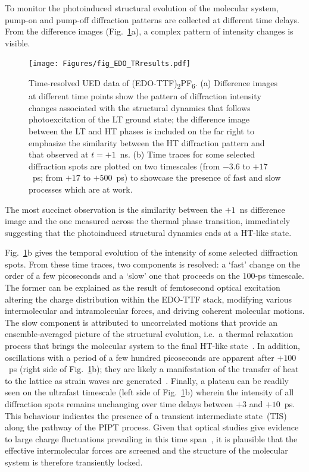 To monitor the photoinduced structural evolution of the molecular system,
pump-on and pump-off diffraction patterns are collected at different time delays.
From the difference images (Fig.~\ref{fig: EDO-TRresults}a),
a complex pattern of intensity changes is visible.
%
\begin{figure}[ht!]
  \centering
  \texttt{[image: Figures/fig\_EDO\_TRresults.pdf]}
  \caption[Time-resolved UED data of (EDO-TTF)\textsubscript{2}PF\textsubscript{6}.]{
  Time-resolved UED data of (EDO-TTF)\textsubscript{2}PF\textsubscript{6}.
  (a) Difference images at different time points show the pattern of diffraction intensity changes
  associated with the structural dynamics that follows photoexcitation of the LT ground state;
  the difference image between the LT and HT phases is included on the far right to emphasize
  the similarity between the HT diffraction pattern and that observed at $t = +1$~ns.
  (b) Time traces for some selected diffraction spots are plotted on two timescales
  (from $-3.6$ to $+17$~ps; from $+17$ to $+500$~ps)
  to showcase the presence of fast and slow processes which are at work.
  }
  \label{fig: EDO-TRresults}
\end{figure}
%
The most succinct observation is the similarity between the $+1$~ns difference image and the one measured
across the thermal phase transition, immediately suggesting that the photoinduced structural dynamics ends
at a HT-like state.

Fig.~\ref{fig: EDO-TRresults}b gives the temporal evolution of the intensity of
some selected diffraction spots. From these time traces, two components is resolved:
a `fast' change on the order of a few picoseconds and a `slow' one that proceeds on the 100-ps timescale.
%
The former can be explained as the result of femtosecond optical excitation
altering the charge distribution within the EDO-TTF stack, modifying various intermolecular and intramolecular forces,
and driving coherent molecular motions.
%
The slow component is attributed to uncorrelated motions that provide an ensemble-averaged picture
of the structural evolution, i.e.~a thermal relaxation process that brings the molecular system
to the final HT-like state~\cite{Fukazawa2012}.
%
In addition, oscillations with a period of a few hundred picoseconds are apparent after $+100$~ps
(right side of Fig.~\ref{fig: EDO-TRresults}b);
they are likely a manifestation of the transfer of heat to the lattice
as strain waves are generated~\cite{Harb2009, Maher-thesis}.
%
Finally, a plateau can be readily seen on the ultrafast timescale (left side of Fig.~\ref{fig: EDO-TRresults}b)
wherein the intensity of all diffraction spots remains unchanging over time delays between $+3$ and $+10$~ps.
This behaviour indicates the presence of a transient intermediate state~(TIS)
along the pathway of the PIPT process.
Given that optical studies give evidence to large charge fluctuations
prevailing in this time span~\cite{Onda2008, Fukazawa2012},
it is plausible that the effective intermolecular forces are screened and
the structure of the molecular system is therefore transiently locked.

